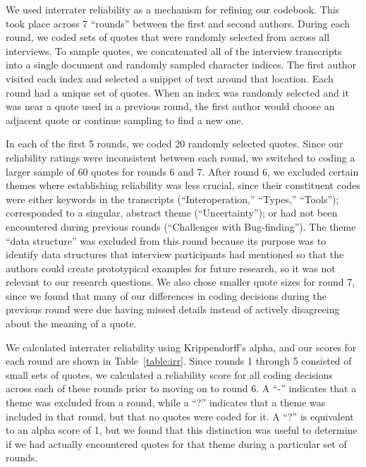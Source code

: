 We used interrater reliability as a mechanism for refining our codebook. This took place across 7 ``rounds'' between the first and second authors. During each round, we coded sets of quotes that were randomly selected from across all interviews. To sample quotes, we concatenated all of the interview transcripts into a single document and randomly sampled character indices. The first author visited each index and selected a snippet of text around that location. Each round had a unique set of quotes. When an index was randomly selected and it was near a quote used in a previous round, the first author would choose an adjacent quote or continue sampling to find a new one.

In each of the first 5 rounds, we coded 20 randomly selected quotes. Since our reliability ratings were inconsistent between each round, we switched to coding a larger sample of 60 quotes for rounds 6 and 7. After round 6, we excluded certain themes where establishing reliability was less crucial, since their constituent codes were either keywords in the transcripts (``Interoperation,'' ``Types,'' ``Tools''); corresponded to a singular, abstract theme (``Uncertainty''); or had not been encountered during previous rounds (``Challenges with Bug-finding''). The theme ``\unsafe data structure'' was excluded from this round because its purpose was to identify data structures that interview participants had mentioned so that the authors could create prototypical examples for future research, so it was not relevant to our research questions. We also chose smaller quote sizes for round 7, since we found that many of our differences in coding decisions during the previous round were due having missed details instead of actively disagreeing about the meaning of a quote. 

We calculated interrater reliability using Krippendorff's alpha, and our scores for each round are shown in Table~\ref{table:irr}. Since rounds 1 through 5 consisted of small sets of quotes, we calculated a reliability score for all coding decisions across each of these rounds prior to moving on to round 6. A ``-'' indicates that a theme was excluded from a round, while a ``?'' indicates that a theme was included in that round, but that no quotes were coded for it. A ``?'' is equivalent to an alpha score of 1, but we found that this distinction was useful to determine if we had actually encountered quotes for that theme during a particular set of rounds.

